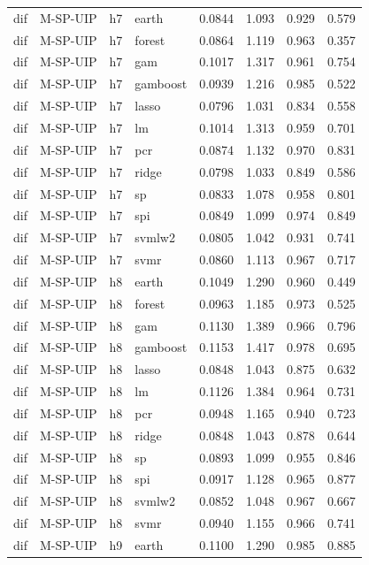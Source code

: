 \begin{ThreePartTable}
\begin{longtable}[t]{llclcccc}
\addlinespace
dif & M-SP-UIP & h7 & earth & 0.0844 & 1.093 & 0.929 & 0.579\\
dif & M-SP-UIP & h7 & forest & 0.0864 & 1.119 & 0.963 & 0.357\\
dif & M-SP-UIP & h7 & gam & 0.1017 & 1.317 & 0.961 & 0.754\\
dif & M-SP-UIP & h7 & gamboost & 0.0939 & 1.216 & 0.985 & 0.522\\
dif & M-SP-UIP & h7 & lasso & 0.0796 & 1.031 & 0.834 & 0.558\\
dif & M-SP-UIP & h7 & lm & 0.1014 & 1.313 & 0.959 & 0.701\\
dif & M-SP-UIP & h7 & pcr & 0.0874 & 1.132 & 0.970 & 0.831\\
dif & M-SP-UIP & h7 & ridge & 0.0798 & 1.033 & 0.849 & 0.586\\
dif & M-SP-UIP & h7 & sp & 0.0833 & 1.078 & 0.958 & 0.801\\
dif & M-SP-UIP & h7 & spi & 0.0849 & 1.099 & 0.974 & 0.849\\
dif & M-SP-UIP & h7 & svmlw2 & 0.0805 & 1.042 & 0.931 & 0.741\\
dif & M-SP-UIP & h7 & svmr & 0.0860 & 1.113 & 0.967 & 0.717\\
\addlinespace
dif & M-SP-UIP & h8 & earth & 0.1049 & 1.290 & 0.960 & 0.449\\
dif & M-SP-UIP & h8 & forest & 0.0963 & 1.185 & 0.973 & 0.525\\
dif & M-SP-UIP & h8 & gam & 0.1130 & 1.389 & 0.966 & 0.796\\
dif & M-SP-UIP & h8 & gamboost & 0.1153 & 1.417 & 0.978 & 0.695\\
dif & M-SP-UIP & h8 & lasso & 0.0848 & 1.043 & 0.875 & 0.632\\
dif & M-SP-UIP & h8 & lm & 0.1126 & 1.384 & 0.964 & 0.731\\
dif & M-SP-UIP & h8 & pcr & 0.0948 & 1.165 & 0.940 & 0.723\\
dif & M-SP-UIP & h8 & ridge & 0.0848 & 1.043 & 0.878 & 0.644\\
dif & M-SP-UIP & h8 & sp & 0.0893 & 1.099 & 0.955 & 0.846\\
dif & M-SP-UIP & h8 & spi & 0.0917 & 1.128 & 0.965 & 0.877\\
dif & M-SP-UIP & h8 & svmlw2 & 0.0852 & 1.048 & 0.967 & 0.667\\
dif & M-SP-UIP & h8 & svmr & 0.0940 & 1.155 & 0.966 & 0.741\\
\addlinespace
dif & M-SP-UIP & h9 & earth & 0.1100 & 1.290 & 0.985 & 0.885\\

\end{longtable}
\end{ThreePartTable}
